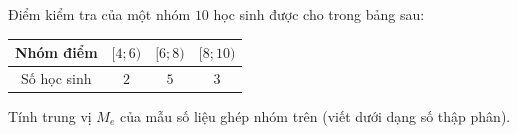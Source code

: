 \begin{ex}%
Điểm kiểm tra của một nhóm $10$ học sinh được cho trong bảng sau:
\begin{center}
\begin{tabular}{|c|c|c|c|}
\hline
Nhóm điểm & $[4;6)$ & $[6;8)$ & $[8;10)$ \\
\hline
Số học sinh & $2$ & $5$ & $3$ \\
\hline
\end{tabular}
\end{center}
Tính trung vị $M_e$ của mẫu số liệu ghép nhóm trên (viết dưới dạng số thập phân).
\loigiai{
Cỡ mẫu $n = 10 \Rightarrow \dfrac{n}{2} = 5$. Nhóm chứa trung vị là $[6; 8)$ nên $M_e = 6 + \dfrac{5 - 2}{5}\cdot 2 = 7{,}2$.
}
\end{ex}

